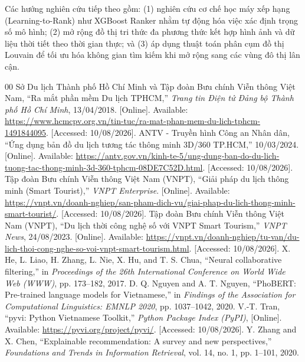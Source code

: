\documentclass[journal,onecolumn,10pt]{IEEEtran}
\begin{document}
Các hướng nghiên cứu tiếp theo gồm: (1) nghiên cứu cơ chế học máy xếp hạng (Learning-to-Rank) như XGBoost Ranker nhằm tự động hóa việc xác định trọng số mô hình; (2) mở rộng đồ thị tri thức đa phương thức kết hợp hình ảnh và dữ liệu thời tiết theo thời gian thực; và (3) áp dụng thuật toán phân cụm đồ thị Louvain để tối ưu hóa không gian tìm kiếm khi mở rộng sang các vùng đô thị lân cận.

\FloatBarrier

\renewcommand{\refname}{TÀI LIỆU THAM KHẢO}
\begin{thebibliography}{00}
 Sở Du lịch Thành phố Hồ Chí Minh và Tập đoàn Bưu chính Viễn thông Việt Nam, ``Ra mắt phần mềm Du lịch TPHCM,'' \textit{Trang tin Điện tử Đảng bộ Thành phố Hồ Chí Minh}, 13/04/2018. [Online]. Available: \url{https://www.hcmcpv.org.vn/tin-tuc/ra-mat-phan-mem-du-lich-tphcm-1491844095}. [Accessed: 10/08/2026].
 ANTV - Truyền hình Công an Nhân dân, ``Ứng dụng bản đồ du lịch tương tác thông minh 3D/360 TP.HCM,'' 10/03/2024. [Online]. Available: \url{https://antv.gov.vn/kinh-te-5/ung-dung-ban-do-du-lich-tuong-tac-thong-minh-3d-360-tphcm-08DE7C52D.html}. [Accessed: 10/08/2026].
 Tập đoàn Bưu chính Viễn thông Việt Nam (VNPT), ``Giải pháp du lịch thông minh (Smart Tourist),'' \textit{VNPT Enterprise}. [Online]. Available: \url{https://vnpt.vn/doanh-nghiep/san-pham-dich-vu/giai-phap-du-lich-thong-minh-smart-tourist/}. [Accessed: 10/08/2026].
 Tập đoàn Bưu chính Viễn thông Việt Nam (VNPT), ``Du lịch thời công nghệ số với VNPT Smart Tourism,'' \textit{VNPT News}, 24/08/2023. [Online]. Available: \url{https://vnpt.vn/doanh-nghiep/tu-van/du-lich-thoi-cong-nghe-so-voi-vnpt-smart-tourism.html}. [Accessed: 10/08/2026].
 X. He, L. Liao, H. Zhang, L. Nie, X. Hu, and T. S. Chua, ``Neural collaborative filtering,'' in \textit{Proceedings of the 26th International Conference on World Wide Web (WWW)}, pp. 173--182, 2017.
 D. Q. Nguyen and A. T. Nguyen, ``PhoBERT: Pre-trained language models for Vietnamese,'' in \textit{Findings of the Association for Computational Linguistics: EMNLP 2020}, pp. 1037--1042, 2020.
 V.-T. Tran, ``pyvi: Python Vietnamese Toolkit,'' \textit{Python Package Index (PyPI)}, [Online]. Available: \url{https://pyvi.org/project/pyvi/}. [Accessed: 10/08/2026].
 Y. Zhang and X. Chen, ``Explainable recommendation: A survey and new perspectives,'' \textit{Foundations and Trends in Information Retrieval}, vol. 14, no. 1, pp. 1--101, 2020.

\end{thebibliography}
\end{document}
